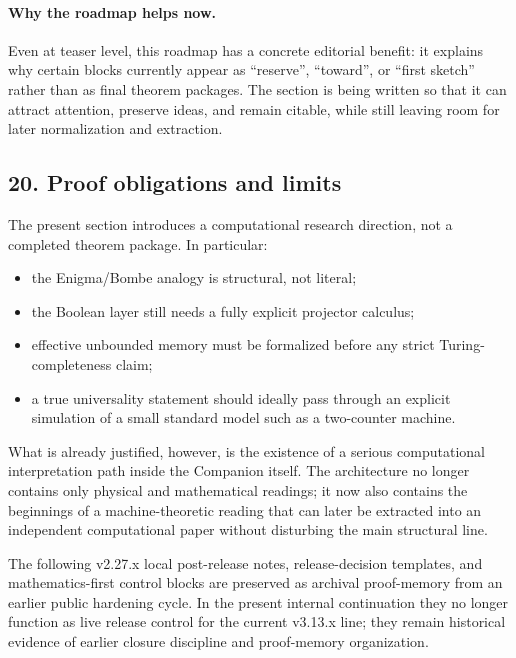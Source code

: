 \paragraph{Why the roadmap helps now.}
Even at teaser level, this roadmap has a concrete editorial benefit: it explains why certain blocks currently appear as ``reserve'', ``toward'', or ``first sketch'' rather than as final theorem packages. The section is being written so that it can attract attention, preserve ideas, and remain citable, while still leaving room for later normalization and extraction.

\subsection*{20. Proof obligations and limits}

The present section introduces a computational research direction, not a completed theorem package. In particular:
\begin{itemize}[leftmargin=2em]
  \item the Enigma/Bombe analogy is structural, not literal;
  \item the Boolean layer still needs a fully explicit projector calculus;
  \item effective unbounded memory must be formalized before any strict Turing-completeness claim;
  \item a true universality statement should ideally pass through an explicit simulation of a small standard model such as a two-counter machine.
\end{itemize}
What is already justified, however, is the existence of a serious computational interpretation path inside the Companion itself. The architecture no longer contains only physical and mathematical readings; it now also contains the beginnings of a machine-theoretic reading that can later be extracted into an independent computational paper without disturbing the main structural line.


\begin{remark}
The following v2.27.x local post-release notes, release-decision templates, and mathematics-first control blocks are preserved as archival proof-memory from an earlier public hardening cycle. In the present internal continuation they no longer function as live release control for the current v3.13.x line; they remain historical evidence of earlier closure discipline and proof-memory organization.\end{remark}

